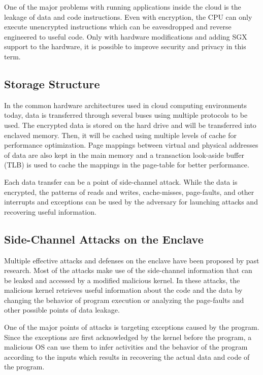 One of the major problems with running applications inside the cloud is the leakage of data and code instructions. Even with encryption, the CPU can only execute unencrypted instructions which can be eavesdropped and reverse engineered to useful code. Only with hardware modifications and adding SGX support to the hardware, it is possible to improve security and privacy in this term.

\subsection{Storage Structure}

In the common hardware architectures used in cloud computing environments today, data is transferred through several buses using multiple protocols to be used. The encrypted data is stored on the hard drive and will be transferred into enclaved memory. Then, it will be cached using multiple levels of cache for performance optimization. Page mappings between virtual and physical addresses of data are also kept in the main memory and a transaction look-aside buffer (TLB) is used to cache the mappings in the page-table for better performance.

Each data transfer can be a point of side-channel attack. While the data is encrypted, the patterns of reads and writes, cache-misses, page-faults, and other interrupts and exceptions can be used by the adversary for launching attacks and recovering useful information.

\subsection{Side-Channel Attacks on the Enclave}

Multiple effective attacks and defenses on the enclave have been proposed by past research. Most of the attacks make use of the side-channel information that can be leaked and accessed by a modified malicious kernel. In these attacks, the malicious kernel retrieves useful information about the code and the data by changing the behavior of program execution or analyzing the page-faults and other possible points of data leakage.

One of the major points of attacks is targeting exceptions caused by the program. Since the exceptions are first acknowledged by the kernel before the program, a malicious OS can use them to infer activities and the behavior of the program according to the inputs which results in recovering the actual data and code of the program.

